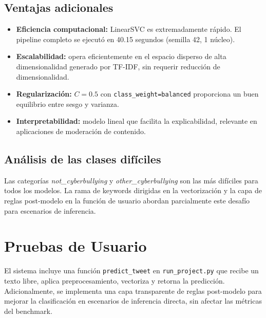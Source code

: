 ﻿\documentclass[12pt,a4paper]{article}
\begin{document}
\subsection{Ventajas adicionales}
\begin{itemize}
  \item \textbf{Eficiencia computacional:} LinearSVC es extremadamente
        rápido. El pipeline completo se ejecutó en 40.15 segundos
        (semilla 42, 1 núcleo).
  \item \textbf{Escalabilidad:} opera eficientemente en el espacio
        disperso de alta dimensionalidad generado por TF-IDF, sin
        requerir reducción de dimensionalidad.
  \item \textbf{Regularización:} $C=0.5$ con \texttt{class\_weight=balanced}
        proporciona un buen equilibrio entre sesgo y varianza.
  \item \textbf{Interpretabilidad:} modelo lineal que facilita la
        explicabilidad, relevante en aplicaciones de moderación de
        contenido.
\end{itemize}

\subsection{Análisis de las clases difíciles}
Las categorías \textit{not\_cyberbullying} y \textit{other\_cyberbullying}
son las más difíciles para todos los modelos. La rama de keywords dirigidas
en la vectorización y la capa de reglas post-modelo en la función de
usuario abordan parcialmente este desafío para escenarios de inferencia.

\section{Pruebas de Usuario}

El sistema incluye una función \texttt{predict\_tweet} en
\texttt{run\_project.py} que recibe un texto libre, aplica preprocesamiento,
vectoriza y retorna la predicción. Adicionalmente, se implementa una
capa transparente de reglas post-modelo para mejorar la clasificación
en escenarios de inferencia directa, sin afectar las métricas del
benchmark.
\end{document}
